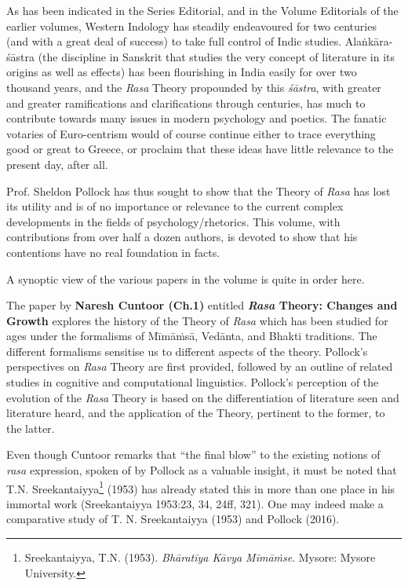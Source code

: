 As has been indicated in the Series Editorial, and in the Volume Editorials of the earlier volumes, Western Indology has steadily endeavoured for two centuries (and with a great deal of success) to take full control of Indic studies. Alaṅkāra-śāstra (the discipline in Sanskrit that studies the very concept of literature in its origins as well as effects) has been flourishing in India easily for over two thousand years, and the \textsl{Rasa} Theory propounded by this \textsl{śāstra}, with greater and greater ramifications and clarifications through centuries, has much to contribute towards many issues in modern psychology and poetics. The fanatic votaries of Euro-centrism would of course continue either to trace everything good or great to Greece, or proclaim that these ideas have little relevance to the present day, after all.

Prof. Sheldon Pollock has thus sought to show that the Theory of \textsl{Rasa} has lost its utility and is of no importance or relevance to the current complex developments in the fields of psychology/rhetorics. This volume, with contributions from over half a dozen authors, is devoted to show that his contentions have no real foundation in facts.

A synoptic view of the various papers in the volume is quite in order here.

The paper by {\bf Naresh Cuntoor (Ch.1)} entitled {\bf\textsl{Rasa} Theory: Changes and Growth} explores the history of the Theory of \textsl{Rasa} which has been studied for ages under the formalisms of Mīmāṁsā, Vedānta, and Bhakti traditions. The different formalisms sensitise us to different aspects of the theory. Pollock’s perspectives on \textsl{Rasa} Theory are first provided, followed by an outline of related studies in cognitive and computational linguistics. Pollock’s perception of the evolution of the \textsl{Rasa} Theory is based on the differentiation of literature seen and literature heard, and the application of the Theory, pertinent to the former, to the latter.

Even though Cuntoor remarks that “the final blow” to the existing notions of \textsl{rasa} expression, spoken of by Pollock as a valuable insight, it must be noted that T.N. Sreekantaiyya\footnote[1]{Sreekantaiyya, T.N. (1953). \textsl{Bhāratīya Kāvya Mīmāṁse}. Mysore: Mysore University.} (1953) has already stated this in more than one place in his immortal work (Sreekantaiyya 1953:23, 34, 24ff, 321). One may indeed make a comparative study of T. N. Sreekantaiyya (1953) and Pollock (2016).

